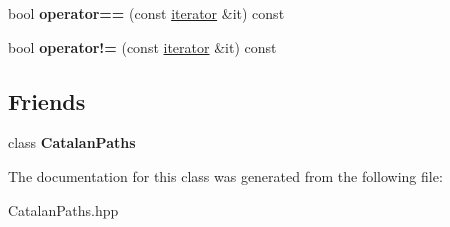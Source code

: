 \begin{DoxyCompactItemize}
\item 
\hypertarget{classdis_1_1_catalan_paths_1_1iterator_a25478486528bebe158df644f10068217}{bool {\bfseries operator==} (const \hyperlink{classdis_1_1_catalan_paths_1_1iterator}{iterator} \&it) const }\label{classdis_1_1_catalan_paths_1_1iterator_a25478486528bebe158df644f10068217}

\item 
\hypertarget{classdis_1_1_catalan_paths_1_1iterator_aeb932d200faa7dc06cce1e5f9a7c0fcf}{bool {\bfseries operator!=} (const \hyperlink{classdis_1_1_catalan_paths_1_1iterator}{iterator} \&it) const }\label{classdis_1_1_catalan_paths_1_1iterator_aeb932d200faa7dc06cce1e5f9a7c0fcf}

\end{DoxyCompactItemize}
\subsection*{Friends}
\begin{DoxyCompactItemize}
\item 
\hypertarget{classdis_1_1_catalan_paths_1_1iterator_a7b949c9c097ffe02e325dd5667f6c4b1}{class {\bfseries Catalan\-Paths}}\label{classdis_1_1_catalan_paths_1_1iterator_a7b949c9c097ffe02e325dd5667f6c4b1}

\end{DoxyCompactItemize}


The documentation for this class was generated from the following file\-:\begin{DoxyCompactItemize}
\item 
Catalan\-Paths.\-hpp\end{DoxyCompactItemize}
